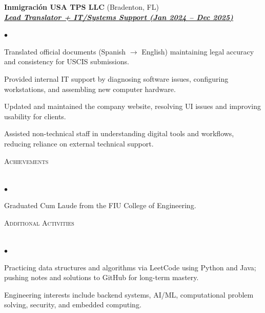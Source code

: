 \documentclass[a4paper]{article}
\newcommand{\lineunder}{
    \vspace*{-8pt}\\
    \hspace*{-18pt}\hrulefill\\
}
\newcommand{\header}[1]{
    {\hspace*{-18pt}\vspace*{6pt} \textsc{#1}}
    \vspace*{-6pt}\lineunder
}
\newcommand{\employer}[3]{
    {\textbf{#1} (#2)\\ \underline{\textbf{\emph{#3}}}\\}
}
\newenvironment{achievements}{
    \begin{list}
        {$\bullet$}{\topsep 0pt \itemsep -2pt}
    }{
        \vspace*{4pt}
    \end{list}
}
\begin{document}
\employer{Inmigraci\'on USA TPS LLC}{Bradenton, FL}{Lead Translator + IT/Systems Support (Jan 2024 -- Dec 2025)}
\begin{achievements}
    \item Translated official documents (Spanish $\rightarrow$ English) maintaining legal accuracy and consistency for USCIS submissions.
    \item Provided internal IT support by diagnosing software issues, configuring workstations, and assembling new computer hardware.
    \item Updated and maintained the company website, resolving UI issues and improving usability for clients.
    \item Assisted non-technical staff in understanding digital tools and workflows, reducing reliance on external technical support.
\end{achievements}

\header{Achievements}
\begin{achievements}
    \item Graduated Cum Laude from the FIU College of Engineering.
\end{achievements}

\header{Additional Activities}
\begin{achievements}
    \item Practicing data structures and algorithms via LeetCode using Python and Java; pushing notes and solutions to GitHub for long-term mastery.
    \item Engineering interests include backend systems, AI/ML, computational problem solving, security, and embedded computing.
\end{achievements}
\end{document}

